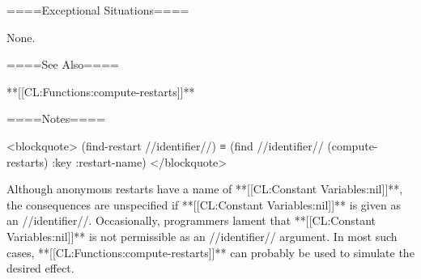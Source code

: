 ====Exceptional Situations====

None.

====See Also====

**[[CL:Functions:compute-restarts]]**

====Notes====

<blockquote> (find-restart //identifier//) ≡ (find //identifier// (compute-restarts) :key :restart-name) </blockquote>

Although anonymous restarts have a name of **[[CL:Constant Variables:nil]]**, the consequences are unspecified if **[[CL:Constant Variables:nil]]** is given as an //identifier//. Occasionally, programmers lament that **[[CL:Constant Variables:nil]]** is not permissible as an //identifier// argument. In most such cases, **[[CL:Functions:compute-restarts]]** can probably be used to simulate the desired effect.

  
